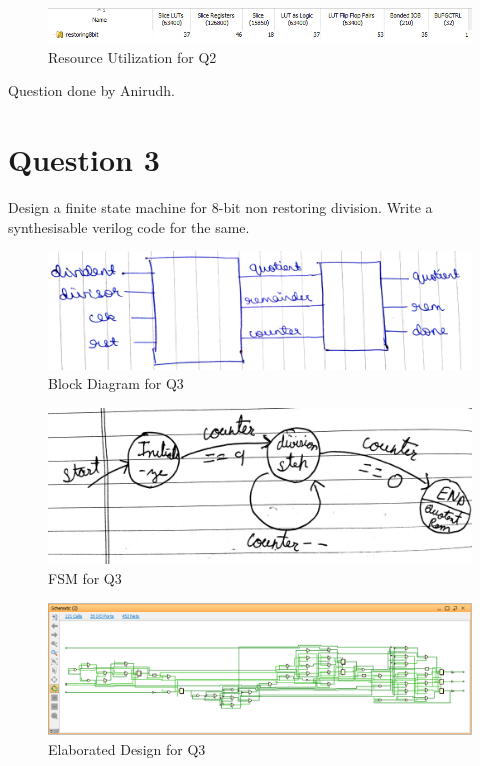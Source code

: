 \documentclass[11pt,a4paper]{article}
\begin{document}
	 \begin{figure}[H]
	 	\centering
	 	\includegraphics[width=1\linewidth]{images/q2utilization}
	 	\caption[]{Resource Utilization for Q2}
	 	\label{fig:q2utilization}
	 \end{figure}
	 Question done by Anirudh.\\
	  \section*{Question 3}
	 Design a finite state machine for 8-bit non restoring division. Write a synthesisable verilog code for the same. 
	 \begin{figure}[H]
	 	\centering
	 	\includegraphics[width=1\linewidth]{images/q2blockdiag}
	 	\caption[]{Block Diagram for Q3}
	 	\label{fig:q3blck}
	 \end{figure}
	 	\begin{figure}[H]
	 	\centering
	 	\includegraphics[scale=0.1]{images/q2fsm}
	 	\caption[]{FSM for Q3}
	 	\label{fig:q3fsm}
	 \end{figure}
	 
	 \begin{figure}[H]
	 	\centering
	 	\includegraphics[width=1\linewidth]{images/q3elaborated}
	 	\caption[]{Elaborated Design for Q3}
	 	\label{fig:q3elaborated}
	 \end{figure}
\end{document}
